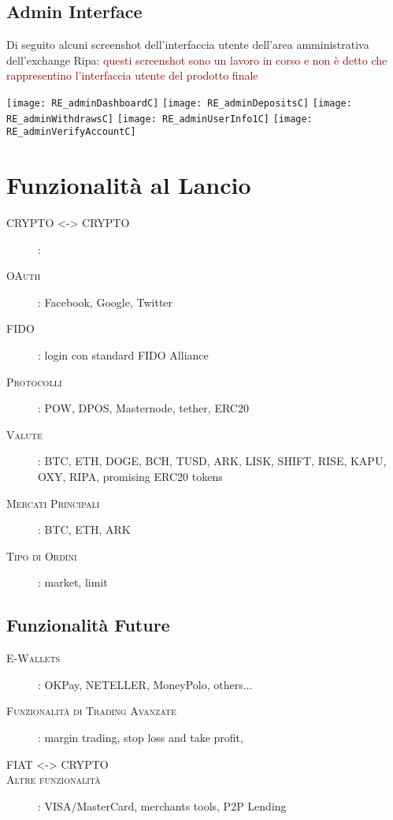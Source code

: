 \documentclass[11pt,fleqn,oneside]{book} %
\begin{document}
\subsection{Admin Interface}
Di seguito alcuni screenshot dell'interfaccia utente dell'area amministrativa dell'exchange Ripa:
\textcolor{darkred}{questi screenshot sono un lavoro in corso e non è detto che rappresentino l'interfaccia utente del prodotto finale}\\
\begin{center}
	\texttt{[image: RE\_adminDashboardC]}
	\texttt{[image: RE\_adminDepositsC]}
	\texttt{[image: RE\_adminWithdrawsC]}
	\texttt{[image: RE\_adminUserInfo1C]}
	\texttt{[image: RE\_adminVerifyAccountC]}
\end{center}

\section{Funzionalità al Lancio}
\begin{description}
	\item[\textsc{CRYPTO <-> CRYPTO}]:
	\item[\textsc{OAuth}]: Facebook, Google, Twitter
	\item[\textsc{FIDO}]: login con standard FIDO Alliance
	\item[\textsc{Protocolli}]: POW, DPOS, Masternode, tether, ERC20
	\item[\textsc{Valute}]: BTC, ETH, DOGE, BCH, TUSD, ARK, LISK, SHIFT, RISE, KAPU, OXY, RIPA, promising ERC20 tokens
	\item[\textsc{Mercati Principali}]: BTC, ETH, ARK
	\item[\textsc{Tipo di Ordini}]: market, limit
\end{description}

\subsection{Funzionalità Future}
\begin{description}
	\item[\textsc{E-Wallets}]: OKPay, NETELLER, MoneyPolo, others...
	\item[\textsc{Funzionalità di Trading Avanzate}]: margin trading, stop loss and take profit, 
	\item[\textsc{FIAT <-> CRYPTO}]
	\item[\textsc{Altre funzionalità}]: VISA/MasterCard, merchants tools, P2P Lending 
\end{description}
\end{document}
